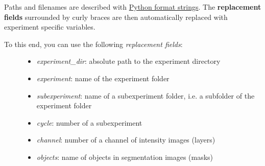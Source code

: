 \documentclass[letterpaper,10pt,english]{sphinxmanual}
\begin{document}
Paths and filenames are described with \href{https://docs.python.org/2/library/string.html\#formatstrings}{Python format strings}. The \textbf{replacement fields} surrounded by curly braces \code{\{\}} are then automatically replaced with experiment specific variables.
\begin{description}
\item[{To this end, you can use the following \emph{replacement fields}:}] \leavevmode\begin{itemize}
\item {} 
\emph{experiment\_dir}: absolute path to the experiment directory

\item {} 
\emph{experiment}: name of the experiment folder

\item {} 
\emph{subexperiment}: name of a subexperiment folder, i.e. a subfolder of the experiment folder

\item {} 
\emph{cycle}: number of a subexperiment

\item {} 
\emph{channel}: number of a channel of intensity images (layers)

\item {} 
\emph{objects}: name of objects in segmentation images (masks)

\end{itemize}

\end{description}
\end{document}

